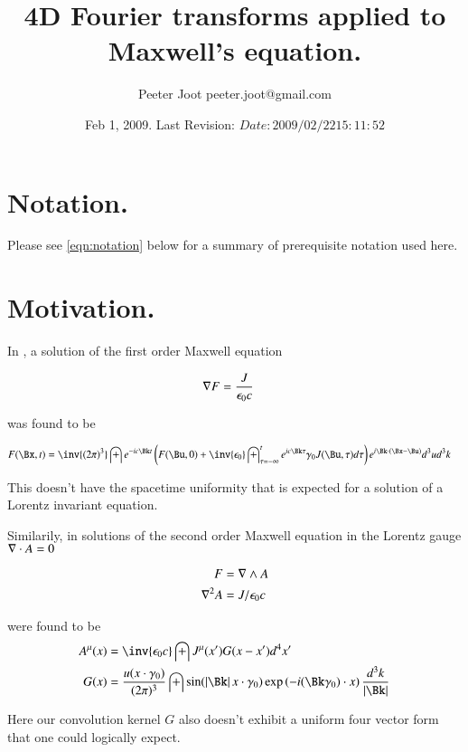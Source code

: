 \documentclass{article}
\title{ 4D Fourier transforms applied to Maxwell's equation. }
\author{Peeter Joot \quad peeter.joot@gmail.com}
\date{ Feb 1, 2009.  Last Revision: $Date: 2009/02/22 15:11:52 $ }
\begin{document}
\maketitle{}
\tableofcontents

\section{ Notation. }

Please see \ref{eqn:notation} below for a summary of prerequisite notation used here.

\section{ Motivation. }

In \cite{PJfirstOrderMaxwell}, a solution of the first order Maxwell equation

\begin{align}
\nabla F &= \frac{J }{\epsilon_0 c}
\end{align}

was found to be

\begin{align}
F(\Bx,t) 
&=
\inv{({2\pi})^3} \int 
e^{-i c \Bk t}
\left(
F(\Bu, 0) + \inv{\epsilon_0} \int_{\tau = -\infty}^{t} e^{i c \Bk \tau } \gamma_0 J(\Bu,\tau)  d\tau  
\right)
e^{i \Bk \cdot (\Bx-\Bu)} 
d^3 u
d^3 k
\end{align}

This doesn't have the spacetime uniformity that is expected for a solution of a Lorentz invariant equation.

Similarily, in \cite{PJfourierMaxwellSecondOrder} solutions of the second order Maxwell equation in the Lorentz gauge
$\nabla \cdot A = 0$ 

\begin{align*}
F &= \nabla \wedge A \\
\nabla^2 A &= J/\epsilon_0 c
\end{align*}

were found to be
\begin{align}\label{eqn:fourVectorPotentials}
{A^\mu}(x)
&= \inv{\epsilon_0 c} \int J^\mu(x') G(x - x') d^4 x' \\
G(x)
&= 
\frac{u(x \cdot \gamma_0)}{ (2\pi)^3 }
\int
\sin( \Abs{\Bk} x \cdot \gamma_0 )
\exp\left( -i (\Bk \gamma_0) \cdot x \right)
\frac{d^3 k}{ \Abs{\Bk} }
\end{align}

Here our convolution kernel $G$ also doesn't exhibit a uniform four vector form that one could logically expect.
\end{document}
